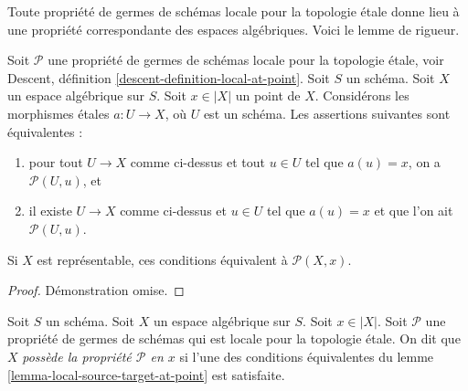 \noindent
Toute propriété de germes de schémas locale pour la topologie \'etale donne lieu à une
propriété correspondante des espaces algébriques. Voici le lemme de rigueur.

\begin{lemma}
\label{lemma-local-source-target-at-point}
Soit $\mathcal{P}$ une propriété de germes de schémas locale pour la topologie \'etale, voir
Descent, définition \ref{descent-definition-local-at-point}.
Soit $S$ un schéma.
Soit $X$ un espace algébrique sur $S$.
Soit $x \in |X|$ un point de $X$.
Considérons les morphismes \'etales $a : U \to X$, où $U$ est un schéma.
Les assertions suivantes sont équivalentes :
\begin{enumerate}
\item pour tout $U \to X$ comme ci-dessus et tout $u \in U$ tel que $a(u) = x$, on a
$\mathcal{P}(U, u)$, et
\item il existe $U \to X$ comme ci-dessus et $u \in U$ tel que $a(u) = x$ et que l'on ait
$\mathcal{P}(U, u)$.
\end{enumerate}
Si $X$ est représentable, ces conditions équivalent à $\mathcal{P}(X, x)$.
\end{lemma}

\begin{proof}
Démonstration omise.
\end{proof}

\begin{definition}
\label{definition-property-at-point}
Soit $S$ un schéma. Soit $X$ un espace algébrique sur $S$.
Soit $x \in |X|$. Soit $\mathcal{P}$ une propriété de germes de schémas qui est
locale pour la topologie \'etale.
On dit que $X$ {\it possède la propriété $\mathcal{P}$ en $x$} si l'une des
conditions équivalentes du
lemme \ref{lemma-local-source-target-at-point}
est satisfaite.
\end{definition}

